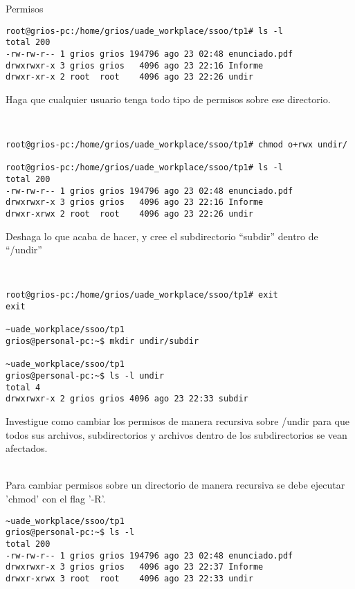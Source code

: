 \begin{section}{Permisos}
\begin{lstlisting}[style=Ubuntu]
root@grios-pc:/home/grios/uade_workplace/ssoo/tp1# ls -l
total 200
-rw-rw-r-- 1 grios grios 194796 ago 23 02:48 enunciado.pdf
drwxrwxr-x 3 grios grios   4096 ago 23 22:16 Informe
drwxr-xr-x 2 root  root    4096 ago 23 22:26 undir
\end{lstlisting}

\begin{quoting}
Haga que cualquier usuario tenga todo tipo de permisos sobre ese directorio.
\end{quoting}\\
\begin{lstlisting}[style=Ubuntu]
root@grios-pc:/home/grios/uade_workplace/ssoo/tp1# chmod o+rwx undir/

root@grios-pc:/home/grios/uade_workplace/ssoo/tp1# ls -l
total 200
-rw-rw-r-- 1 grios grios 194796 ago 23 02:48 enunciado.pdf
drwxrwxr-x 3 grios grios   4096 ago 23 22:16 Informe
drwxr-xrwx 2 root  root    4096 ago 23 22:26 undir
\end{lstlisting}

\begin{quoting}
Deshaga lo que acaba de hacer, y cree el subdirectorio “subdir” dentro de “/undir”
\end{quoting}\\
\begin{lstlisting}[style=Ubuntu]
root@grios-pc:/home/grios/uade_workplace/ssoo/tp1# exit
exit

~uade_workplace/ssoo/tp1
grios@personal-pc:~$ mkdir undir/subdir

~uade_workplace/ssoo/tp1
grios@personal-pc:~$ ls -l undir 
total 4
drwxrwxr-x 2 grios grios 4096 ago 23 22:33 subdir
\end{lstlisting}

\begin{quoting}
Investigue como cambiar los permisos de manera recursiva sobre /undir para que todos sus
archivos, subdirectorios y archivos dentro de los subdirectorios se vean afectados.
\end{quoting}\\

Para cambiar permisos sobre un directorio de manera recursiva se debe ejecutar 'chmod' con el flag '-R'.

\begin{lstlisting}[style=Ubuntu]
~uade_workplace/ssoo/tp1
grios@personal-pc:~$ ls -l
total 200
-rw-rw-r-- 1 grios grios 194796 ago 23 02:48 enunciado.pdf
drwxrwxr-x 3 grios grios   4096 ago 23 22:37 Informe
drwxr-xrwx 3 root  root    4096 ago 23 22:33 undir


\end{lstlisting}
\end{section}
